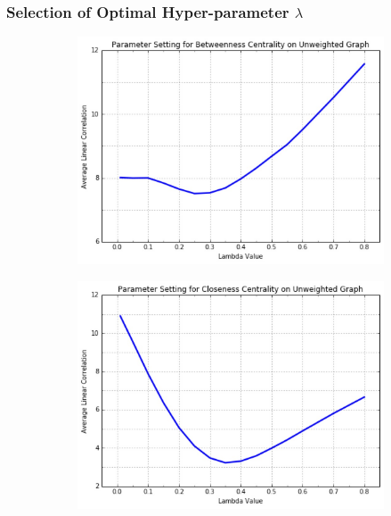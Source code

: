 \documentclass[10pt]{beamer}
\begin{document}
\begin{frame}
\frametitle{Selection of Optimal Hyper-parameter $\lambda$}
\vspace{0.15in}
\begin{figure}[H]
\centering
\begin{subfigure}{.4\textwidth}
  \centering
  \includegraphics[width=0.95\linewidth]{BCU_2.jpeg}
\end{subfigure}
\begin{subfigure}{.4\textwidth}
	\centering
    \includegraphics[width=0.95\linewidth]{CCU_2.jpeg}
\end{subfigure}


\end{figure}
\end{frame}
\end{document}
